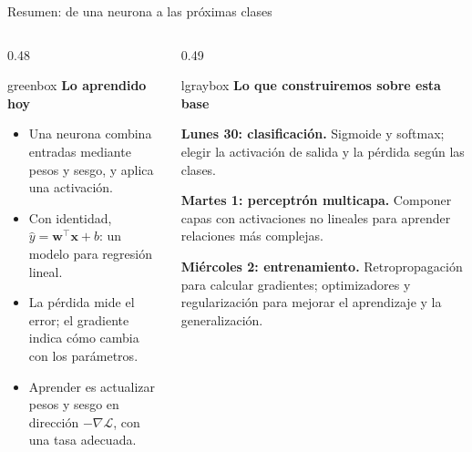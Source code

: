 \documentclass[10pt,aspectratio=169,xcolor={dvipsnames}]{beamer}
\newenvironment{caja}[1][lgraybox]{\begin{beamercolorbox}[sep=0.7em,wd=\linewidth]{#1}}{\end{beamercolorbox}}
\begin{document}
\begin{frame}{Resumen: de una neurona a las próximas clases}
    \begin{columns}[T]
        \begin{column}{0.48\textwidth}
            \begin{caja}[greenbox]
                \textbf{Lo aprendido hoy}\par\medskip
                \small
                \begin{itemize}
                    \item Una neurona combina entradas mediante pesos y sesgo, y aplica una activación.
                    \item Con identidad, $\hat y=\bm w^\top\bm x+b$: un modelo para regresión lineal.
                    \item La pérdida mide el error; el gradiente indica cómo cambia con los parámetros.
                    \item Aprender es actualizar pesos y sesgo en dirección $-\nabla\mathcal L$, con una tasa adecuada.
                \end{itemize}
            \end{caja}
        \end{column}
        \begin{column}{0.49\textwidth}
            \begin{caja}
                \textbf{Lo que construiremos sobre esta base}\par\medskip
                \small
                \textbf{Lunes 30: clasificación.} Sigmoide y softmax; elegir la activación de salida y la pérdida según las clases.\par\medskip
                \textbf{Martes 1: perceptrón multicapa.} Componer capas con activaciones no lineales para aprender relaciones más complejas.\par\medskip
                \textbf{Miércoles 2: entrenamiento.} Retropropagación para calcular gradientes; optimizadores y regularización para mejorar el aprendizaje y la generalización.
            \end{caja}
        \end{column}
    \end{columns}
    \medskip
\end{frame}
\end{document}
